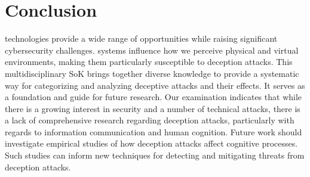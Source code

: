 
\section{Conclusion}
\label{sec:conclusion}

% 
\MR technologies provide a wide range of opportunities while raising significant cybersecurity challenges. 
\MR systems influence how we perceive physical and virtual environments, making them particularly susceptible to deception attacks.
This multidisciplinary SoK brings together diverse knowledge to provide a systematic way for categorizing and analyzing \MR deceptive attacks and their effects. 
It serves as a foundation and guide for future research.
Our examination indicates that while there is a growing interest in \MR security and a number of technical attacks, there is a lack of comprehensive research regarding deception attacks, particularly with regards to information communication and human cognition. 
Future work should investigate empirical studies of how \MR deception attacks affect cognitive processes.
Such studies can inform new techniques for detecting and mitigating threats from \MR deception attacks.



